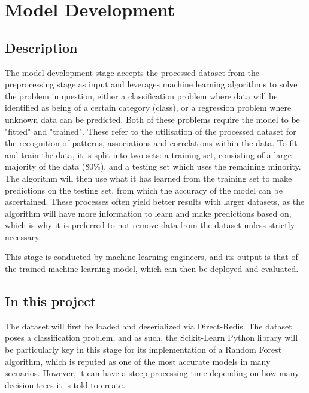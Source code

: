 \section{Model Development}\label{sec:Development}
\subsection{Description}
The model development stage accepts the processed dataset from the preprocessing stage as input and leverages 
machine learning algorithms to solve the problem in question, either a classification problem where 
data will be identified as being of a certain category (class), or a regression problem where unknown 
data can be predicted. Both of these problems require the model to be "fitted" and "trained".
These refer to the utilisation of the processed dataset for the recognition of patterns, 
associations and correlations within the data. To fit and train the data, it is split into two sets:
a training set, consisting of a large majority of the data (\~80\%), and a testing set which uses the 
remaining minority. The algorithm will then use what it has learned from the training set to make predictions 
on the testing set, from which the accuracy of the model can be ascertained. These processes often yield better
results with larger datasets, as the algorithm will have more information to learn and make predictions based on,
which is why it is preferred to not remove data from the dataset unless strictly necessary.

\para This stage is conducted by machine learning engineers, and its output is that of the trained machine learning 
model, which can then be deployed and evaluated.

\subsection{In this project}
The dataset will first be loaded and deserialized via Direct-Redis. The dataset poses a classification 
problem, and as such, the Scikit-Learn Python library 
will be particularly key in this stage for its implementation of a Random Forest algorithm, which is 
reputed as one of the most accurate models in many scenarios. However, it can have a steep processing
time depending on how many decision trees it is told to create. 

